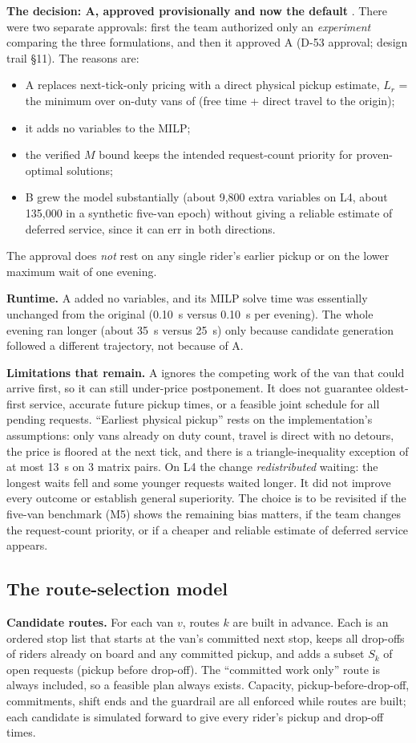\documentclass[11pt,letterpaper]{article}
\newcommand{\status}[2]{{\setlength{\fboxsep}{1.1pt}\fcolorbox{#1}{white}{\textcolor{#1}{\sffamily\scriptsize\strut #2}}}}
\newcommand{\Provisional}{\status{cProvisional}{provisional}}
\newcommand{\D}[1]{D-#1}
\begin{document}
\textbf{The decision: A, approved provisionally and now the default} \Provisional. There were two separate approvals: first the team authorized only an \emph{experiment} comparing the three formulations, and then it approved A (\D{53} approval; design trail §11). The reasons are:
\begin{itemize}
\item A replaces next-tick-only pricing with a direct physical pickup estimate, $L_r$ = the minimum over on-duty vans of (free time + direct travel to the origin);
\item it adds no variables to the MILP;
\item the verified $M$ bound keeps the intended request-count priority for proven-optimal solutions;
\item B grew the model substantially (about 9,800 extra variables on L4, about 135,000 in a synthetic five-van epoch) without giving a reliable estimate of deferred service, since it can err in both directions.
\end{itemize}
The approval does \emph{not} rest on any single rider's earlier pickup or on the lower maximum wait of one evening.

\textbf{Runtime.} A added no variables, and its MILP solve time was essentially unchanged from the original (0.10~s versus 0.10~s per evening). The whole evening ran longer (about 35~s versus 25~s) only because candidate generation followed a different trajectory, not because of A.

\textbf{Limitations that remain.} A ignores the competing work of the van that could arrive first, so it can still under-price postponement. It does not guarantee oldest-first service, accurate future pickup times, or a feasible joint schedule for all pending requests. ``Earliest physical pickup'' rests on the implementation's assumptions: only vans already on duty count, travel is direct with no detours, the price is floored at the next tick, and there is a triangle-inequality exception of at most 13~s on 3 matrix pairs. On L4 the change \emph{redistributed} waiting: the longest waits fell and some younger requests waited longer. It did not improve every outcome or establish general superiority. The choice is to be revisited if the five-van benchmark (M5) shows the remaining bias matters, if the team changes the request-count priority, or if a cheaper and reliable estimate of deferred service appears.

\subsection{The route-selection model}
\textbf{Candidate routes.} For each van $v$, routes $k$ are built in advance. Each is an ordered stop list that starts at the van's committed next stop, keeps all drop-offs of riders already on board and any committed pickup, and adds a subset $S_k$ of open requests (pickup before drop-off). The ``committed work only'' route is always included, so a feasible plan always exists. Capacity, pickup-before-drop-off, commitments, shift ends and the guardrail are all enforced while routes are built; each candidate is simulated forward to give every rider's pickup and drop-off times.
\end{document}
